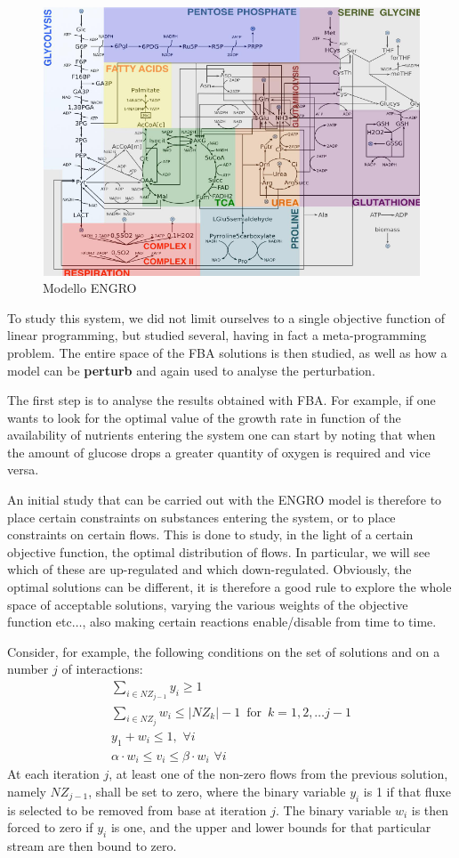 \begin{figure}[!ht]
    \centering
    \includegraphics[width=0.5\linewidth]{img/ENGRO.png}
    \caption{Modello ENGRO}
    \label{fig:engro}
\end{figure}

To study this system, we did not limit ourselves to a single objective function of linear 
programming, but studied several, having in fact a meta-programming problem. The entire space
of the FBA solutions is then studied, as well as how a model can be \textbf{perturb} and again used to analyse the perturbation.

The first step is to analyse the results obtained with FBA. For example, if one wants to look
for the optimal value of the growth rate in function of the availability of nutrients entering 
the system one can start by noting that when the amount of glucose drops a greater quantity of 
oxygen is required and vice versa.

An initial study that can be carried out with the ENGRO model is therefore to place certain 
constraints on substances entering the system, or to place constraints on certain flows. This 
is done to study, in the light of a certain objective function, the optimal distribution of 
flows. In particular, we will see which of these are up-regulated and which down-regulated.
Obviously, the optimal solutions can be different, it is therefore a good rule to explore the 
whole space of acceptable solutions, varying the various weights of the objective function 
etc$\dots$, also making certain reactions enable/disable from time to time.

Consider, for example, the following conditions on the set of solutions and on a number $j$ of 
interactions:
\begin{equation}
    \begin{split}
        \sum_{i \in NZ_{j - 1}} y_i \geq 1 \\
        \sum_{i \in NZ_j} w_i \leq |NZ_k|-1 \, \, \, \text{for} \,\,\,k = 1, 2, \dots j - 1\\
        y_1 + w_i \leq 1, \,\, \forall i \\ \alpha \cdot w_i \leq v_i \leq \beta \cdot w_i \, \, \forall i
    \end{split}
\end{equation}
At each iteration $j$, at least one of the non-zero flows from the previous solution, namely 
$NZ_{j - 1}$, shall be set to zero, where the binary variable $y_i$ is 1 if that fluxe is 
selected to be removed from base at iteration $j$. The binary variable $w_i$ is then forced to 
zero if $y_i$ is one, and the upper and lower bounds for that particular stream are then bound 
to zero.

